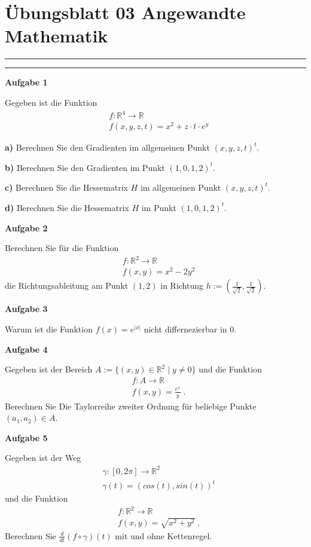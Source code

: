 \documentclass[a4paper,13pt]{scrartcl}
\begin{document}
\section*{\large  Übungsblatt 03 \hfill Angewandte Mathematik }
\hrule
\hrule
\vspace{4mm}
{\bf Aufgabe 1}

Gegeben ist die Funktion 
\begin{align*}
& f : \mathbb{R}^4 \to \mathbb{R} \\
& f(x,y,z,t) = x^2 + z\cdot t \cdot e^y 
\end{align*}

{\bf a)}  Berechnen Sie den Gradienten im allgemeinen Punkt $(x,y,z,t)^t$.

{\bf b)}  Berechnen Sie den Gradienten im  Punkt $(1,0,1,2)^t$.

{\bf c)}  Berechnen Sie die Hessematrix $H$ im allgemeinen Punkt $(x,y,z,t)^t$.

{\bf d)}  Berechnen Sie die Hessematrix $H$ im  Punkt $(1,0,1,2)^t$.


\vspace{8mm}
{\bf Aufgabe 2}

Berechnen Sie für die Funktion 
\begin{align*}
& f : \mathbb{R}^2 \to \mathbb{R} \\
& f(x,y) = x^2  - 2y^2 
\end{align*}
die Richtungsableitung am Punkt $(1,2)$ in Richtung $h:= (\frac{1}{\sqrt{2}}, \frac{1}{\sqrt{2}})$.

\vspace{8mm}
{\bf Aufgabe 3}

Warum ist die Funktion $f(x) = e^{|x|}$ nicht differnezierbar in $0$.


\vspace{8mm}
{\bf Aufgabe 4}

Gegeben ist der Bereich $A:= \{ (x,y) \in \mathbb{R}^2 \; | \;  y \neq 0 \}$ und die Funktion
\begin{align*}
& f : A  \to \mathbb{R} \\
& f(x,y) = \frac{e^x}{y} \;.
\end{align*}
 Berechnen Sie Die Taylorreihe zweiter Ordnung für beliebige Punkte $(a_1, a_2) \in A$.

\vspace{8mm}
{\bf Aufgabe 5}

Gegeben ist der Weg 
\begin{align*}
& \gamma : [0, 2 \pi] \to \mathbb{R}^2 \\
& \gamma(t) = (cos(t), sin(t))^t
\end{align*}
und die Funktion 
\begin{align*}
& f : \mathbb{R}^2 \to\mathbb{R}  \\
& f(x,y) = \sqrt{x^2 + y^2} \;.
\end{align*}
Berechnen Sie $\frac{d}{dt} (f \circ \gamma) (t)$ mit und ohne  Kettenregel.
\end{document}
